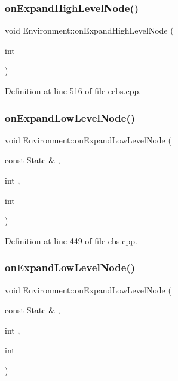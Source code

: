 \subsubsection{\texorpdfstring{on\+Expand\+High\+Level\+Node()}{onExpandHighLevelNode()}\hspace{0.1cm}{\footnotesize\ttfamily [2/2]}}
{\footnotesize\ttfamily void Environment\+::on\+Expand\+High\+Level\+Node (\begin{DoxyParamCaption}\item[{int}]{ }\end{DoxyParamCaption})\hspace{0.3cm}{\ttfamily [inline]}}



Definition at line 516 of file ecbs.\+cpp.

\mbox{\label{class_environment_ad00ee2a501b1e78f19c86a0d01e49d52}} 
\subsubsection{\texorpdfstring{on\+Expand\+Low\+Level\+Node()}{onExpandLowLevelNode()}\hspace{0.1cm}{\footnotesize\ttfamily [1/2]}}
{\footnotesize\ttfamily void Environment\+::on\+Expand\+Low\+Level\+Node (\begin{DoxyParamCaption}\item[{const \hyperlink{struct_state}{State} \&}]{,  }\item[{int}]{,  }\item[{int}]{ }\end{DoxyParamCaption})\hspace{0.3cm}{\ttfamily [inline]}}



Definition at line 449 of file cbs.\+cpp.

\mbox{\label{class_environment_ad00ee2a501b1e78f19c86a0d01e49d52}} 
\subsubsection{\texorpdfstring{on\+Expand\+Low\+Level\+Node()}{onExpandLowLevelNode()}\hspace{0.1cm}{\footnotesize\ttfamily [2/2]}}
{\footnotesize\ttfamily void Environment\+::on\+Expand\+Low\+Level\+Node (\begin{DoxyParamCaption}\item[{const \hyperlink{struct_state}{State} \&}]{,  }\item[{int}]{,  }\item[{int}]{ }\end{DoxyParamCaption})\hspace{0.3cm}{\ttfamily [inline]}}



